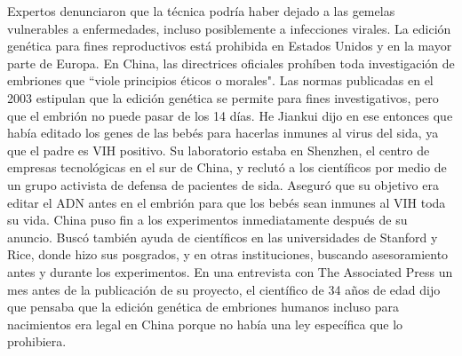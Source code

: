 \documentclass{article}%
\begin{document}
\newline%
%
Expertos denunciaron que la técnica podría haber dejado a las gemelas vulnerables a enfermedades, incluso posiblemente a infecciones virales. \newline%
\newline%
La edición genética para fines reproductivos está prohibida en Estados Unidos y en la mayor parte de Europa.%
\newline%
%
En China, las directrices oficiales prohíben toda investigación de embriones que ``viole principios éticos o morales". Las normas publicadas en el 2003 estipulan que la edición genética se permite para fines investigativos, pero que el embrión no puede pasar de los 14 días.%
\newline%
%
He Jiankui dijo en ese entonces que había editado los genes de las bebés para hacerlas inmunes al virus del sida, ya que el padre es VIH positivo. Su laboratorio estaba en Shenzhen, el centro de empresas tecnológicas en el sur de China, y reclutó a los científicos por medio de un grupo activista de defensa de pacientes de sida.%
\newline%
%
Aseguró que su objetivo era editar el ADN antes en el embrión para que los bebés sean inmunes al VIH toda su vida. \newline%
\newline%
China puso fin a los experimentos inmediatamente después de su anuncio.%
\newline%
%
Buscó también ayuda de científicos en las universidades de Stanford y Rice, donde hizo sus posgrados, y en otras instituciones, buscando asesoramiento antes y durante los experimentos.%
\newline%
%
En una entrevista con The Associated Press un mes antes de la publicación de su proyecto, el científico de 34 años de edad dijo que pensaba que la edición genética de embriones humanos incluso para nacimientos era legal en China porque no había una ley específica que lo prohibiera.%
\newline%
%
\end{document}
